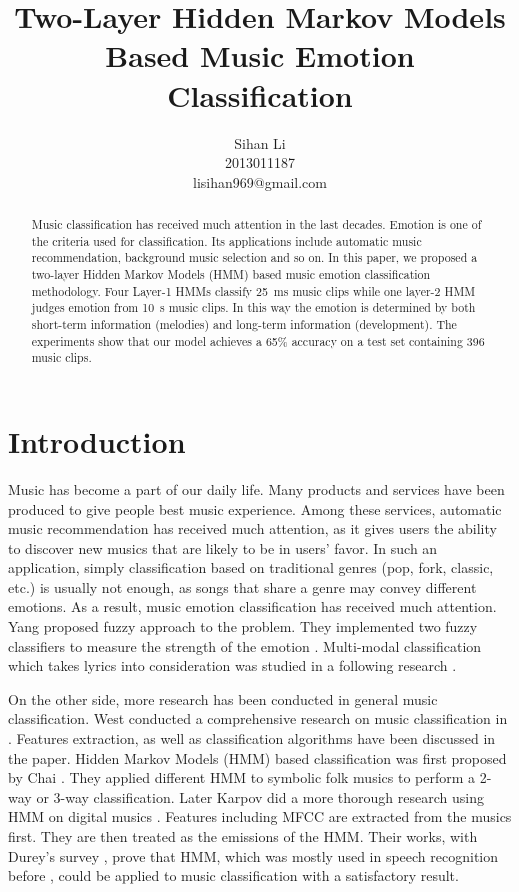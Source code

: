 \documentclass{IEEEtran}
\title{Two-Layer Hidden Markov Models Based Music Emotion Classification}
\author{Sihan Li\\2013011187\\lisihan969@gmail.com}
\begin{document}
  \maketitle

  \begin{abstract}
    Music classification has received much attention in the last decades.
    Emotion is one of the criteria used for classification. Its applications
    include automatic music recommendation, background music selection and
    so on. In this paper, we proposed a two-layer Hidden Markov Models (HMM)
    based music emotion classification methodology. Four Layer-1 HMMs
    classify 25~ms music clips while one layer-2 HMM judges emotion from 10~s music clips.
    In this way the emotion is determined by both short-term information
    (melodies) and long-term information (development). The experiments show that
    our model achieves a 65\% accuracy on a test set containing 396 music clips.

  \end{abstract}

  \section{Introduction}

  Music has become a part of our daily life. Many products and services have been
  produced to give people best music experience. Among these services,
  automatic music recommendation has received much attention, as it gives users
  the ability to discover new musics that are likely to be in users' favor.
  In such an application, simply classification based on traditional genres
  (pop, fork, classic, etc.) is usually not enough, as songs that share a genre may
  convey different emotions. As a result, music emotion classification has
  received much attention. Yang proposed fuzzy approach to the problem. They
  implemented two fuzzy classifiers to measure the strength of the emotion
  \cite{yang2006music}. Multi-modal classification which takes lyrics into
  consideration was studied in a following research \cite{yang2008toward}.

  On the other side, more research has been conducted in general music
  classification. West conducted a comprehensive research on music
  classification in \cite{west2008novel}. Features extraction, as well as
  classification algorithms have been discussed in the paper. Hidden Markov
  Models (HMM) based classification was first proposed by Chai
  \cite{chai2001folk}. They applied different HMM to symbolic folk musics to
  perform a 2-way or 3-way classification. Later Karpov did a more thorough
  research using HMM on digital musics \cite{karpov2002hidden}. Features
  including MFCC are extracted from the musics first. They are then treated
  as the emissions of the HMM. Their works, with Durey's survey
  \cite{durey2001melody}, prove that HMM, which was mostly used in speech
  recognition before \cite{rabiner1989tutorial}, could be applied to music
  classification with a satisfactory result.
\end{document}
